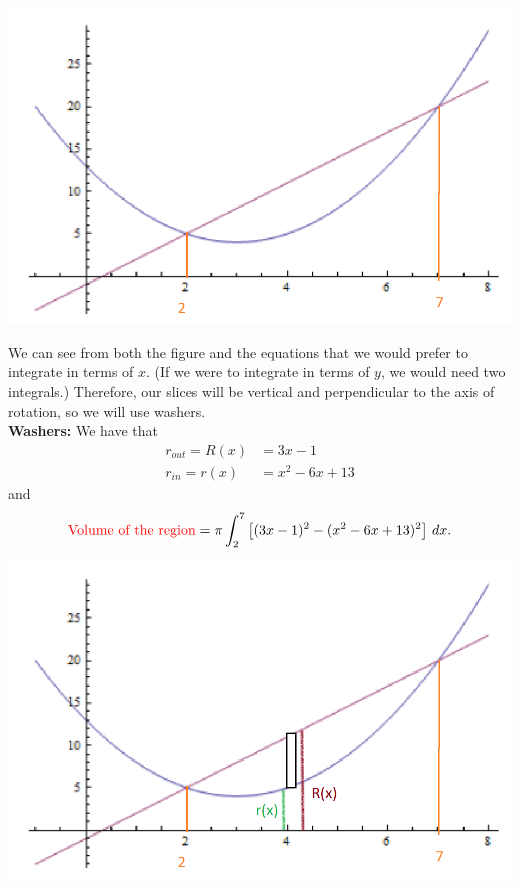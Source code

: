 \documentclass[handout]{ximera}
\begin{document}
\begin{problem}
\begin{enumerate}
\begin{freeResponse}
		\begin{image}
		\includegraphics[scale=0.6]{Figure6-4-1new.png}
		\end{image}
		
		We can see from both the figure and the equations that we would prefer to integrate in terms of $x$.  (If we were to integrate in terms of $y$, we would need two integrals.)  Therefore, our slices will be vertical and perpendicular to the axis of rotation, so we will use washers.\\

		{\bf Washers: }  
		We have that
			\begin{align*}
			r_{out} = R(x) &= 3x-1 \\
			r_{in} = r(x) &= x^2 - 6x +13
			\end{align*}
		and
			\[
			\text{{\color{red} Volume of the region}} = \pi \int_2^7 \left[ (3x-1)^2 - (x^2-6x+13)^2 \right] \,d x.
			\]
			
		\begin{image}
		\includegraphics[scale=0.6]{Figure6-4-3new.png}
		\end{image}
		

\end{freeResponse}
\end{enumerate}
\end{problem}
\end{document}
